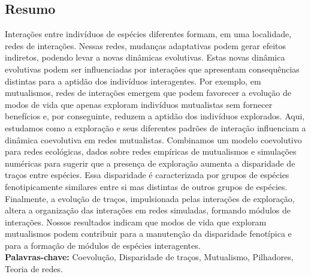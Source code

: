 \documentclass[a4paper, 12pt]{article}
\begin{document}
\begin{singlespace}
\maketitle
\end{singlespace}
\newpage

\subsection*{Resumo}
Interações entre indivíduos de espécies diferentes formam, em uma localidade, redes de interações. Nessas redes, mudanças adaptativas podem gerar efeitos indiretos, podendo levar a novas dinâmicas evolutivas. Estas novas dinâmica evolutivas podem ser influenciadas por interações que apresentam consequências distintas para a aptidão dos indivíduos interagentes. Por exemplo, em mutualismos, redes de interações emergem que podem favorecer a evolução de modos de vida que apenas exploram indivíduos mutualistas sem fornecer benefícios e, por conseguinte, reduzem a aptidão dos indivíduos explorados. Aqui, estudamos como a exploração e seus diferentes padrões de interação influenciam a dinâmica coevolutiva em redes mutualistas. Combinamos  um modelo coevolutivo para redes ecológicas, dados sobre redes empíricas de mutualismos e simulações numéricas para sugerir que a presença de exploração aumenta a disparidade de traços entre espécies. Essa disparidade é caracterizada por grupos de espécies fenotipicamente similares entre si mas distintas de outros grupos de espécies. Finalmente, a evolução de traços, impulsionada pelas interações de exploração, altera a organização das  interações em redes simuladas, formando módulos de interações. Nossos resultados indicam que modos de vida que exploram mutualismos podem contribuir para a manutenção da disparidade fenotípica e para a formação de módulos de espécies interagentes.\\
\textbf{Palavras-chave:}  Coevolução, Disparidade de traços, Mutualismo, Pilhadores, Teoria de redes.

\newpage

\end{document}

